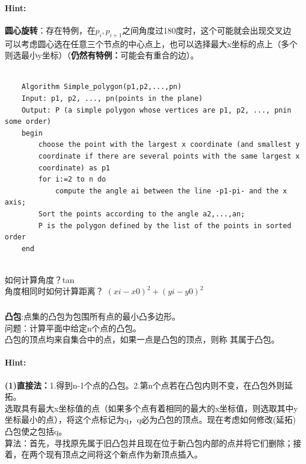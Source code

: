 \documentclass{article}
\begin{document}
     \paragraph{Hint:}\textbf{圆心旋转}：存在特例，在$p_i,p_{i+1}$之间角度过180度时，这个可能就会出现交叉边\\
     可以考虑圆心选在任意三个节点的中心点上，也可以选择最大x坐标的点上（多个则选最小y坐标）（\textbf{仍然有特例：}可能会有重合的边）。
            \lstset{language=C}
    \begin{lstlisting}
    
    Algorithm Simple_polygon(p1,p2,...,pn)
    Input: p1, p2, ..., pn(points in the plane)
    Output: P (a simple polygon whose vertices are p1, p2, ..., pnin some order)
    begin
        choose the point with the largest x coordinate (and smallest y
        coordinate if there are several points with the same largest x
        coordinate) as p1
        for i:=2 to n do
            compute the angle ai between the line -p1-pi- and the x axis;
        Sort the points according to the angle a2,...,an;
        P is the polygon defined by the list of the points in sorted order
    end 
    
   \end{lstlisting}
     
     
     如何计算角度？tan \\
     角度相同时如何计算距离？ $(xi-x0)^2+(yi-y0)^2$\\
     
     \subsubsection{}\textbf{凸包}:点集的凸包为包围所有点的最小凸多边形。\\
问题：计算平面中给定n个点的凸包。\\
凸包的顶点均来自集合中的点，如果一点是凸包的顶点，则称
其属于凸包。

     \paragraph{Hint:}\textbf{(1)直接法：}1.得到n-1个点的凸包。2.第n个点若在凸包内则不变，在凸包外则延拓。\\
     选取具有最大x坐标值的点（如果多个点有着相同的最大的x坐标值，则选取其中y坐标最小的点），将这个点标记为q，q必为凸包的顶点。现在考虑如何修改(延拓)凸包使之包括q。\\
     
     算法：首先，寻找原先属于旧凸包并且现在位于新凸包内部的点并将它们删除；接着，在两个现有顶点之间将这个新点作为新顶点插入。\\
    
\end{document}
